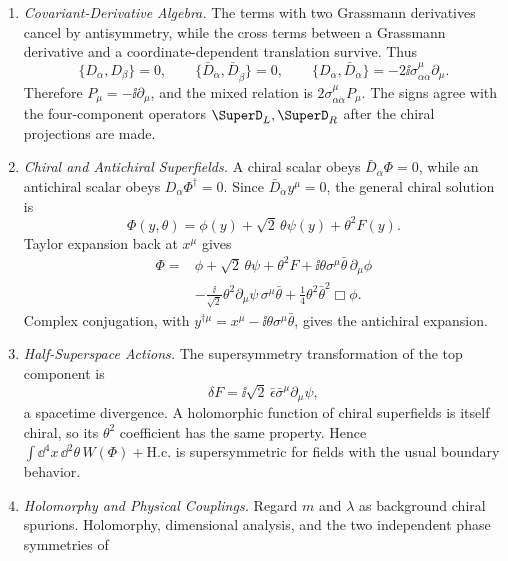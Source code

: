 \begin{enumerate}
  \begin{enumerate}
    \item \emph{Covariant-Derivative Algebra.}
    The terms with two Grassmann derivatives cancel by antisymmetry, while the
      cross terms between a Grassmann derivative and a coordinate-dependent
      translation survive.  Thus
      \[
        \{D_\alpha,D_\beta\}=0,\qquad
        \{\bar D_{\dot\alpha},\bar D_{\dot\beta}\}=0,\qquad
        \{D_\alpha,\bar D_{\dot\alpha}\}
          =-2\ii\sigma^\mu_{\alpha\dot\alpha}\partial_\mu .
      \]
      Therefore \(P_\mu=-\ii\partial_\mu\), and the mixed relation is
      \(2\sigma^\mu_{\alpha\dot\alpha}P_\mu\).  The signs agree with the
      four-component operators \(\SuperD_L,\SuperD_R\) after the chiral
      projections are made.
    \item \emph{Chiral and Antichiral Superfields.}
    A chiral scalar obeys
      \(\bar D_{\dot\alpha}\Phi=0\), while an antichiral scalar obeys
      \(D_\alpha\Phi^\dagger=0\).  Since
      \(\bar D_{\dot\alpha}y^\mu=0\), the general chiral solution is
      \[
        \Phi(y,\theta)=\phi(y)+\sqrt2\,\theta\psi(y)+\theta^2F(y).
      \]
      Taylor expansion back at \(x^\mu\) gives
      \[
      \begin{aligned}
        \Phi={}&\phi+\sqrt2\,\theta\psi+\theta^2F
          +\ii\theta\sigma^\mu\bar\theta\,\partial_\mu\phi\\
          &-\frac{\ii}{\sqrt2}\theta^2
             \partial_\mu\psi\,\sigma^\mu\bar\theta
          +\frac14\theta^2\bar\theta^2\Box\phi .
      \end{aligned}
      \]
      Complex conjugation, with
      \(y^{\dagger\mu}=x^\mu-\ii\theta\sigma^\mu\bar\theta\), gives the
      antichiral expansion.
    \item \emph{Half-Superspace Actions.}
    The supersymmetry transformation of the top component is
      \[
        \delta F
          =\ii\sqrt2\,\bar\epsilon\bar\sigma^\mu\partial_\mu\psi,
      \]
      a spacetime divergence.  A holomorphic function of chiral superfields
      is itself chiral, so its \(\theta^2\) coefficient has the same property.
      Hence
      \(\int \dd^4x\,\dd^2\theta\,W(\Phi)+\mathrm{H.c.}\) is supersymmetric for
      fields with the usual boundary behavior.
    \item \emph{Holomorphy and Physical Couplings.}
    Regard \(m\) and \(\lambda\) as background chiral spurions.  Holomorphy,
      dimensional analysis, and the two independent phase symmetries of

\end{enumerate}
\end{enumerate}
